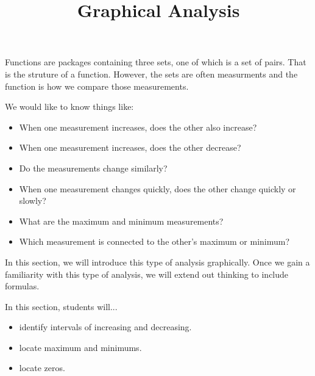 \documentclass{ximera}
\title{Graphical Analysis}
\begin{document}
\begin{abstract}
\end{abstract}
\maketitle




Functions are packages containing three sets, one of which is a set of pairs.  That is the struture of a function.  However, the sets are often measurments and the function is how we compare those measurements.

We would like to know things like:

\begin{itemize}
\item When one measurement increases, does the other also increase?
\item When one measurement increases, does the other decrease?
\item Do the measurements change similarly?
\item When one measurement changes quickly, does the other change quickly or slowly?
\item What are the maximum and minimum measurements?
\item Which measurement is connected to the other's maximum or minimum?
\end{itemize}


In this section, we will introduce this type of analysis graphically. Once we gain a familiarity with this type of analysis, we will extend out thinking to include formulas.











\begin{sectionOutcomes}
In this section, students will...

\begin{itemize}
\item identify intervals of increasing and decreasing.
\item locate maximum and minimums.
\item locate zeros.
\end{itemize}
\end{sectionOutcomes}
\end{document}
